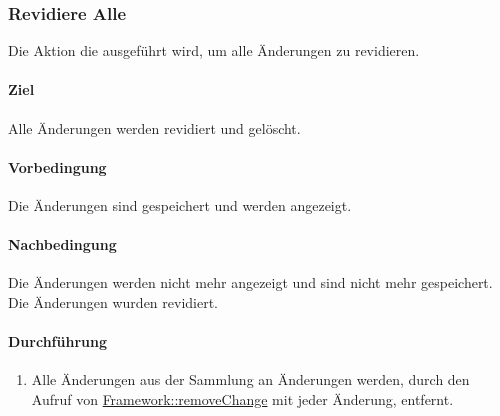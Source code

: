 \newpage
\subsubsection{Revidiere Alle}\label{AP_Aktionen_Änderungen_Revidiere_Alle}

Die Aktion die ausgeführt wird, um alle Änderungen zu revidieren.

\paragraph*{Ziel}
Alle Änderungen werden revidiert und gelöscht.

\paragraph*{Vorbedingung}
Die Änderungen sind gespeichert und werden angezeigt.

\paragraph*{Nachbedingung}
Die Änderungen werden nicht mehr angezeigt und sind nicht mehr gespeichert. Die Änderungen wurden revidiert.

\paragraph*{Durchführung}
\begin{enumerate}
    \item Alle Änderungen aus der Sammlung an Änderungen werden, durch den Aufruf von \hyperref[AP_Framework_removeChange]{Framework::removeChange} mit jeder Änderung, entfernt.
\end{enumerate}